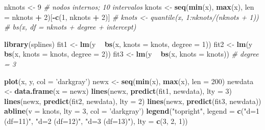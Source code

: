 \documentclass[
  spanish,
]{book}
\newenvironment{Shaded}{\begin{snugshade}}{\end{snugshade}}
\newcommand{\CommentTok}[1]{\textcolor[rgb]{0.56,0.35,0.01}{\textit{#1}}}
\newcommand{\DataTypeTok}[1]{\textcolor[rgb]{0.13,0.29,0.53}{#1}}
\newcommand{\DecValTok}[1]{\textcolor[rgb]{0.00,0.00,0.81}{#1}}
\newcommand{\KeywordTok}[1]{\textcolor[rgb]{0.13,0.29,0.53}{\textbf{#1}}}
\newcommand{\NormalTok}[1]{#1}
\newcommand{\OperatorTok}[1]{\textcolor[rgb]{0.81,0.36,0.00}{\textbf{#1}}}
\newcommand{\StringTok}[1]{\textcolor[rgb]{0.31,0.60,0.02}{#1}}
\theoremstyle{break}
\theoremstyle{definition}
\theoremstyle{definition}
\theoremstyle{definition}
\theoremstyle{remark}
\begin{document}
\begin{Shaded}
\begin{Highlighting}[]
\NormalTok{nknots <-}\StringTok{ }\DecValTok{9} \CommentTok{# nodos internos; 10 intervalos}
\NormalTok{knots <-}\StringTok{ }\KeywordTok{seq}\NormalTok{(}\KeywordTok{min}\NormalTok{(x), }\KeywordTok{max}\NormalTok{(x), }\DataTypeTok{len =}\NormalTok{ nknots }\OperatorTok{+}\StringTok{ }\DecValTok{2}\NormalTok{)[}\OperatorTok{-}\KeywordTok{c}\NormalTok{(}\DecValTok{1}\NormalTok{, nknots }\OperatorTok{+}\StringTok{ }\DecValTok{2}\NormalTok{)]}
\CommentTok{# knots <- quantile(x, 1:nknots/(nknots + 1)) # bs(x, df = nknots + degree + intercept)}

\KeywordTok{library}\NormalTok{(splines)}
\NormalTok{fit1 <-}\StringTok{ }\KeywordTok{lm}\NormalTok{(y }\OperatorTok{~}\StringTok{ }\KeywordTok{bs}\NormalTok{(x, }\DataTypeTok{knots =}\NormalTok{ knots, }\DataTypeTok{degree =} \DecValTok{1}\NormalTok{))}
\NormalTok{fit2 <-}\StringTok{ }\KeywordTok{lm}\NormalTok{(y }\OperatorTok{~}\StringTok{ }\KeywordTok{bs}\NormalTok{(x, }\DataTypeTok{knots =}\NormalTok{ knots, }\DataTypeTok{degree =} \DecValTok{2}\NormalTok{))}
\NormalTok{fit3 <-}\StringTok{ }\KeywordTok{lm}\NormalTok{(y }\OperatorTok{~}\StringTok{ }\KeywordTok{bs}\NormalTok{(x, }\DataTypeTok{knots =}\NormalTok{ knots)) }\CommentTok{# degree = 3}

\KeywordTok{plot}\NormalTok{(x, y, }\DataTypeTok{col =} \StringTok{'darkgray'}\NormalTok{)}
\NormalTok{newx <-}\StringTok{ }\KeywordTok{seq}\NormalTok{(}\KeywordTok{min}\NormalTok{(x), }\KeywordTok{max}\NormalTok{(x), }\DataTypeTok{len =} \DecValTok{200}\NormalTok{)}
\NormalTok{newdata <-}\StringTok{ }\KeywordTok{data.frame}\NormalTok{(}\DataTypeTok{x =}\NormalTok{ newx)}
\KeywordTok{lines}\NormalTok{(newx, }\KeywordTok{predict}\NormalTok{(fit1, newdata), }\DataTypeTok{lty =} \DecValTok{3}\NormalTok{)}
\KeywordTok{lines}\NormalTok{(newx, }\KeywordTok{predict}\NormalTok{(fit2, newdata), }\DataTypeTok{lty =} \DecValTok{2}\NormalTok{)}
\KeywordTok{lines}\NormalTok{(newx, }\KeywordTok{predict}\NormalTok{(fit3, newdata))}
\KeywordTok{abline}\NormalTok{(}\DataTypeTok{v =}\NormalTok{ knots, }\DataTypeTok{lty =} \DecValTok{3}\NormalTok{, }\DataTypeTok{col =} \StringTok{'darkgray'}\NormalTok{)}
\KeywordTok{legend}\NormalTok{(}\StringTok{"topright"}\NormalTok{, }\DataTypeTok{legend =} \KeywordTok{c}\NormalTok{(}\StringTok{"d=1 (df=11)"}\NormalTok{, }\StringTok{"d=2 (df=12)"}\NormalTok{, }\StringTok{"d=3 (df=13)"}\NormalTok{), }
       \DataTypeTok{lty =} \KeywordTok{c}\NormalTok{(}\DecValTok{3}\NormalTok{, }\DecValTok{2}\NormalTok{, }\DecValTok{1}\NormalTok{))}
\end{Highlighting}
\end{Shaded}
\end{document}
